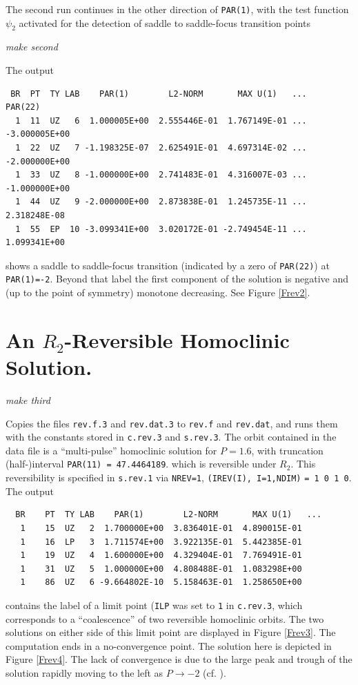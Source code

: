 \documentclass[12pt]{report}
\begin{document}
The second run continues in the other direction of {\tt PAR(1)}, with
the test function $\psi_2$ activated 
for the detection of saddle to saddle-focus transition points
\begin{center}
\it make second
\end{center}
The output
\begin{verbatim}
 BR  PT  TY LAB    PAR(1)        L2-NORM       MAX U(1)   ...    PAR(22)    
  1  11  UZ   6  1.000005E+00  2.555446E-01  1.767149E-01 ... -3.000005E+00
  1  22  UZ   7 -1.198325E-07  2.625491E-01  4.697314E-02 ... -2.000000E+00
  1  33  UZ   8 -1.000000E+00  2.741483E-01  4.316007E-03 ... -1.000000E+00
  1  44  UZ   9 -2.000000E+00  2.873838E-01  1.245735E-11 ...  2.318248E-08
  1  55  EP  10 -3.099341E+00  3.020172E-01 -2.749454E-11 ...  1.099341E+00
\end{verbatim}
shows a saddle to saddle-focus transition 
(indicated by a zero of {\tt PAR(22)}) at {\tt PAR(1)=-2}. Beyond
that label the first component of the solution is negative and (up to the
point of symmetry) monotone decreasing. See Figure \ref{Frev2}.

\section{An $R_2$-Reversible Homoclinic Solution.}

\begin{center}
{\it make third}
\end{center}
Copies the files {\tt rev.f.3} and {\tt rev.dat.3} to 
{\tt rev.f} and {\tt rev.dat}, and runs them with the
constants stored in {\tt c.rev.3} and {\tt s.rev.3}. 
The orbit contained in
the data file is a ``multi-pulse'' homoclinic solution for $P=1.6$, with
truncation (half-)interval {\tt PAR(11) = 47.4464189}.
which is reversible under $R_2$. This reversibility is
specified in {\tt s.rev.1} via {\tt NREV=1}, 
{\tt (IREV(I), I=1,NDIM)} {\tt = 1 0 1 0}. The output 
\begin{verbatim}
  BR    PT  TY LAB    PAR(1)        L2-NORM       MAX U(1)   ...
   1    15  UZ   2  1.700000E+00  3.836401E-01  4.890015E-01  
   1    16  LP   3  1.711574E+00  3.922135E-01  5.442385E-01  
   1    19  UZ   4  1.600000E+00  4.329404E-01  7.769491E-01  
   1    31  UZ   5  1.000000E+00  4.808488E-01  1.083298E+00  
   1    86  UZ   6 -9.664802E-10  5.158463E-01  1.258650E+00  
\end{verbatim}
contains the label of a limit point ({\tt ILP} was set to {\tt 1} in
{\tt c.rev.3}, which corresponds to a ``coalescence'' of two reversible
homoclinic orbits. The two solutions on either side of this limit point are
displayed in Figure \ref{Frev3}. The computation ends in a no-convergence
point. The solution here is depicted in Figure \ref{Frev4}. The lack of
convergence is due to the large peak and trough of the solution rapidly
moving to the left as $P \to -2$ (cf. ).
\end{document}
